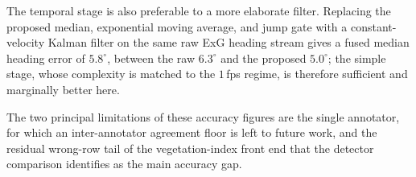 The temporal stage is also preferable to a more elaborate filter. Replacing the
proposed median, exponential moving average, and jump gate with a
constant-velocity Kalman filter on the same raw ExG heading stream gives a fused
median heading error of $5.8^\circ$, between the raw $6.3^\circ$ and the proposed
$5.0^\circ$; the simple stage, whose complexity is matched to the $1$\,fps regime,
is therefore sufficient and marginally better here.

The two principal limitations of these accuracy figures are the single annotator,
for which an inter-annotator agreement floor is left to future work, and the
residual wrong-row tail of the vegetation-index front end that the detector
comparison identifies as the main accuracy gap.
